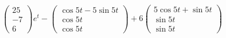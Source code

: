 \documentclass{article}
\begin{document}
\begin{align*}
\begin{pmatrix}
                    25 \\
                    -7 \\
                    6
                  \end{pmatrix} e^t - \begin{pmatrix}
                                        \cos 5 t - 5 \sin 5 t \\
                                        \cos 5 t              \\
                                        \cos 5 t
                                      \end{pmatrix} + 6 \begin{pmatrix}
                                                          5 \cos 5 t + \sin 5 t \\
                                                          \sin 5 t              \\
                                                          \sin 5 t
                                                        \end{pmatrix}                               \\
\end{align*}

\setcounter{subsubsection}{48}
\subsubsection{}
\end{document}
